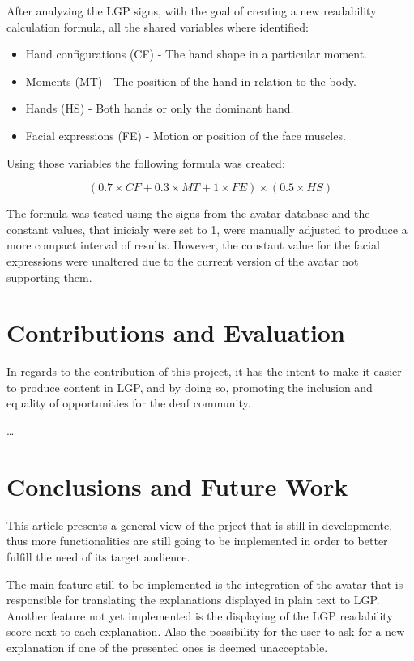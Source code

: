 \documentclass[runningheads]{llncs}
\begin{document}
After analyzing the LGP signs, with the goal of creating a new readability calculation formula, all the shared variables where identified:

\begin{itemize}
    \item Hand configurations (CF) - The hand shape in a particular moment.
    \item Moments (MT) - The position of the hand in relation to the body.
    \item Hands (HS) - Both hands or only the dominant hand.
    \item Facial expressions (FE) - Motion or position of the face muscles.
\end{itemize}

Using those variables the following formula was created:

\begin{equation}
(0.7 \times CF + 0.3 \times MT + 1 \times FE) \times (0.5 \times HS)
\label{eqn1}
\end{equation}

The formula was tested using the signs from the avatar database and the constant values, that inicialy were set to 1, were manually adjusted to produce a more compact interval of results.
However, the constant value for the facial expressions were unaltered due to the current version of the avatar not supporting them.

\section{Contributions and Evaluation}

In regards to the contribution of this project, it has the intent to make it easier to produce content in LGP, and by doing so, promoting the inclusion and equality of opportunities for the deaf community.

\dots

\section{Conclusions and Future Work}


This article presents a general view of the prject that is still in developmente, thus more functionalities are still going to be implemented in order to better fulfill the need of its target audience.

The main feature still to be implemented is the integration of the avatar that is responsible for translating the explanations displayed in plain text to LGP.
Another feature not yet implemented is the displaying of the LGP readability score next to each explanation.
Also the possibility for the user to ask for a new explanation if one of the presented ones is deemed unacceptable.
\end{document}
